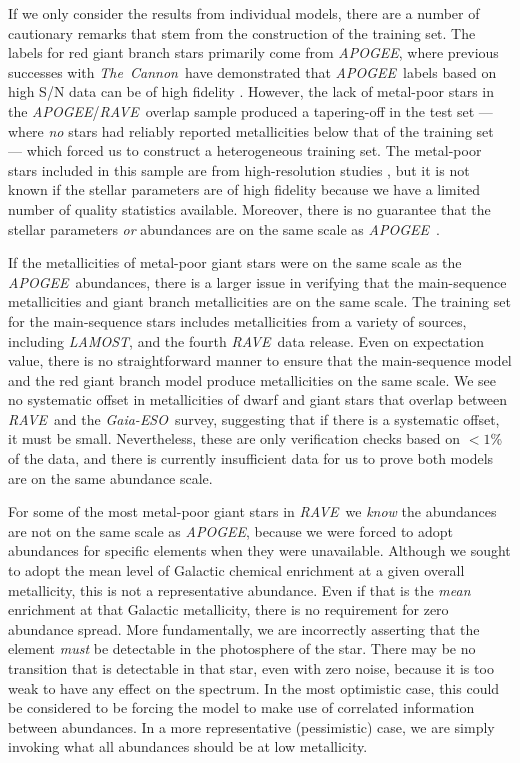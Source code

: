 \documentclass[preprint]{aastex61}
\newcommand{\acronym}[1]{{\small{#1}}}
\newcommand{\project}[1]{\textsl{#1}}
\newcommand{\thecannon}{\project{The~Cannon}}
\newcommand{\rave}{\project{\acronym{RAVE}}}
\newcommand{\ges}{\project{Gaia-ESO}}
\newcommand{\apogee}{\project{\acronym{APOGEE}}}
\newcommand{\lamost}{\project{\acronym{LAMOST}}}
\begin{document}
If we only consider the results from individual models, there are a number of cautionary
remarks that stem from the construction of the training set.  The labels for red giant 
branch stars primarily come from \apogee, where previous successes with \thecannon\
have demonstrated that \apogee\ labels based on high S/N data can be of high fidelity
\citep{Ness_2015,Ness_2016,Ho_2016,Casey_2016b}.
However, the lack of metal-poor stars in the \apogee/\rave\ overlap sample produced
a tapering-off in the test set --- where \emph{no} stars had reliably reported metallicities
below that of the training set --- which forced us to construct a heterogeneous training
set.  The metal-poor stars included in this sample are from high-resolution studies
\citep{Fulbright_2010,Ruchti_2011}, but it is not known if the stellar parameters are
of high fidelity because we have a limited number of quality statistics available. 
Moreover, there is no guarantee that the stellar parameters \emph{or} abundances are 
on the same scale as \apogee\ \citep[and good reasons to believe they will not be; see][]{Smiljanic_2014}.


If the metallicities of metal-poor giant stars were on the same scale as the \apogee\
abundances, there is a larger issue in verifying that the main-sequence metallicities
and giant branch metallicities are on the same scale.  The training set for the
main-sequence stars includes metallicities from a variety of sources, including
\lamost, and the fourth \rave\ data release.  Even on expectation value, there is 
no straightforward manner to ensure that the main-sequence model and the red giant
branch model produce metallicities on the same scale.  We see no systematic offset
in metallicities of dwarf and giant stars that overlap between \rave\ and the \ges\
survey, suggesting that if there is a systematic offset, it must be small. 
Nevertheless, these are only verification checks based on $<1$\% of the data, and 
there is currently insufficient data for us to prove both models are on the same 
abundance scale.


For some of the most metal-poor giant stars in \rave\, we \emph{know} the abundances 
are not on the same scale as \apogee, because we were forced to adopt abundances for 
specific elements when they were unavailable.  Although we sought to adopt the mean
level of Galactic chemical enrichment at a given overall metallicity, this is not a
representative abundance. Even if that is the \emph{mean} enrichment at that Galactic
metallicity, there is no requirement for zero abundance spread.  More fundamentally, 
we are incorrectly asserting that the element \emph{must} be detectable in the 
photosphere of the star.  There may be no transition that is detectable in that 
star, even with zero noise, because it is too weak to have any effect on the 
spectrum.  In the most optimistic case, this could be considered to be forcing the
model to make use of correlated information between abundances.  In a more 
representative (pessimistic) case, we are simply invoking what all abundances should 
be at low metallicity.
\end{document}
